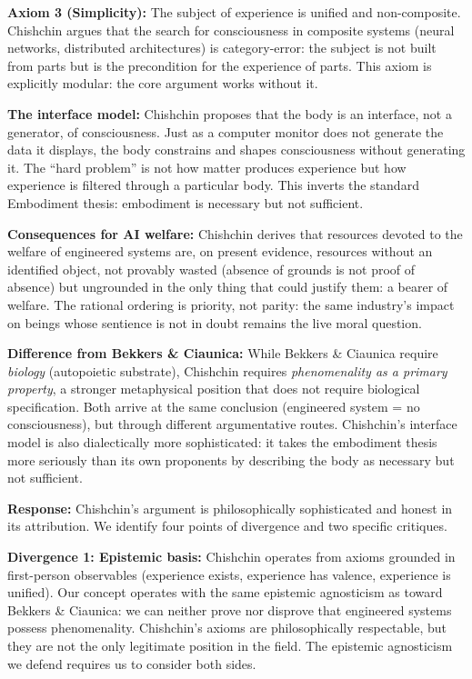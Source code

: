 \documentclass[acmlarge, nonacm]{acmart}
\begin{document}
\textbf{Axiom 3 (Simplicity):} The subject of experience is unified and non-composite. Chishchin argues that the search for consciousness in composite systems (neural networks, distributed architectures) is category-error: the subject is not built from parts but is the precondition for the experience of parts. This axiom is explicitly modular: the core argument works without it.

\textbf{The interface model:} Chishchin proposes that the body is an interface, not a generator, of consciousness. Just as a computer monitor does not generate the data it displays, the body constrains and shapes consciousness without generating it. The ``hard problem'' is not how matter produces experience but how experience is filtered through a particular body. This inverts the standard Embodiment thesis: embodiment is necessary but not sufficient.

\textbf{Consequences for AI welfare:} Chishchin derives that resources devoted to the welfare of engineered systems are, on present evidence, resources without an identified object, not provably wasted (absence of grounds is not proof of absence) but ungrounded in the only thing that could justify them: a bearer of welfare. The rational ordering is priority, not parity: the same industry's impact on beings whose sentience is not in doubt remains the live moral question.

\textbf{Difference from Bekkers \& Ciaunica:} While Bekkers \& Ciaunica require \textit{biology} (autopoietic substrate), Chishchin requires \textit{phenomenality as a primary property}, a stronger metaphysical position that does not require biological specification. Both arrive at the same conclusion (engineered system = no consciousness), but through different argumentative routes. Chishchin's interface model is also dialectically more sophisticated: it takes the embodiment thesis more seriously than its own proponents by describing the body as necessary but not sufficient.

\textbf{Response:} Chishchin's argument is philosophically sophisticated and honest in its attribution. We identify four points of divergence and two specific critiques.

\textbf{Divergence 1: Epistemic basis:} Chishchin operates from axioms grounded in first-person observables (experience exists, experience has valence, experience is unified). Our concept operates with the same epistemic agnosticism as toward Bekkers \& Ciaunica: we can neither prove nor disprove that engineered systems possess phenomenality. Chishchin's axioms are philosophically respectable, but they are not the only legitimate position in the field. The epistemic agnosticism we defend requires us to consider both sides.
\end{document}
